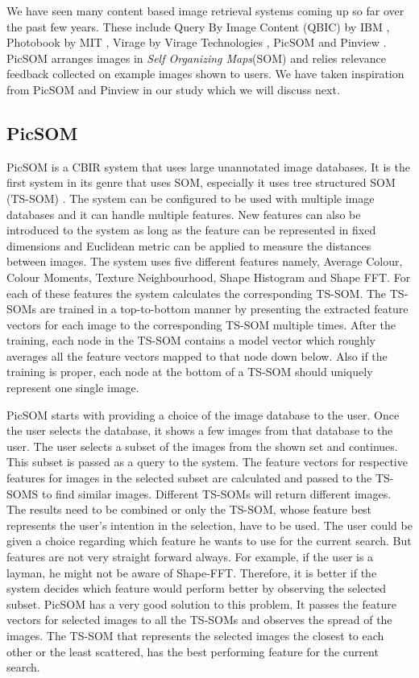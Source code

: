 \documentclass[english]{tktltiki}
\begin{document}
We have seen many content based image retrieval systems coming up so far over the past few years. These include Query By Image Content (QBIC) by IBM \cite{QBIC}, Photobook by MIT \cite{Photobook}, Virage by Virage Technologies \cite{Virage}, PicSOM \cite{PicSOM} and Pinview \cite{Pinview}. PicSOM arranges images in \textit{Self Organizing Maps}(SOM) \cite{SOM} and relies relevance feedback collected on example images shown to users. We have taken inspiration from PicSOM and Pinview in our study which we will discuss next.

\subsection{PicSOM}

PicSOM is a CBIR system that uses large unannotated image databases. It is the first system in its genre that uses SOM, especially it uses tree structured SOM (TS-SOM) \cite{TSSOM, TSSOM_progress}. The system can be configured to be used with multiple image databases and it can handle multiple features. New features can also be introduced to the system as long as the feature can be represented in fixed dimensions and Euclidean metric can be applied to measure the distances between images. The system uses five different features namely, Average Colour, Colour Moments, Texture Neighbourhood, Shape Histogram and Shape FFT. For each of these features the system calculates the corresponding TS-SOM. The TS-SOMs are trained in a top-to-bottom manner by presenting the extracted feature vectors for each image to the corresponding TS-SOM multiple times. After the training, each node in the TS-SOM contains a model vector which roughly averages all the feature vectors mapped to that node down below. Also if the training is proper, each node at the bottom of a TS-SOM should uniquely represent one single image.

PicSOM starts with providing a choice of the image database to the user. Once the user selects the database, it shows a few images from that database to the user. The user selects a subset of the images from the shown set and continues. This subset is passed as a query to the system. The feature vectors for respective features for images in the selected subset are calculated and passed to the TS-SOMS to find similar images. Different TS-SOMs will return different images. The results need to be combined or only the TS-SOM, whose feature best represents the user's intention in the selection, have to be used. The user could be given a choice regarding which feature he wants to use for the current search. But features are not very straight forward always. For example, if the user is a layman, he might not be aware of Shape-FFT. Therefore, it is better if the system decides which feature would perform better by observing the selected subset. PicSOM has a very good solution to this problem. It passes the feature vectors for selected images to all the TS-SOMs and observes the spread of the images. The TS-SOM that represents the selected images the closest to each other or the least scattered, has the best performing feature for the current search.
\end{document}
